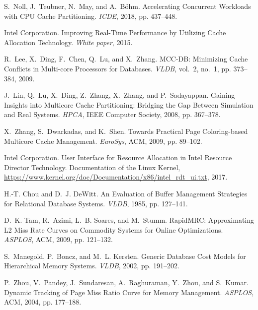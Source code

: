 \documentclass[11pt]{article}
\begin{document}
\begin{thebibliography}{10}
\begin{small}
S.~Noll, J.~Teubner, N.~May, and A.~B\"{o}hm. \newblock Accelerating Concurrent Workloads with CPU Cache Partitioning. \newblock \emph{ICDE}, 2018,
pp. 437--448.

Intel Corporation. \newblock Improving Real-Time Performance by Utilizing Cache Allocation Technology. \newblock \emph{White paper}, 2015.

R.~Lee, X.~Ding, F.~Chen, Q.~Lu, and X.~Zhang. \newblock MCC-DB: Minimizing Cache Conflicts in Multi-core Processors for Databases. \newblock \emph{VLDB},
vol.~2, no.~1, pp. 373--384, 2009.

J.~Lin, Q.~Lu, X.~Ding, Z.~Zhang, X.~Zhang, and P.~Sadayappan. \newblock Gaining Insights into Multicore Cache Partitioning: Bridging the Gap Between Simulation and Real Systems. \newblock \emph{HPCA}, IEEE Computer Society, 2008, pp. 367--378.

X.~Zhang, S.~Dwarkadas, and K.~Shen. \newblock Towards Practical Page Coloring-based Multicore Cache Management. \newblock \emph{EuroSys}, ACM, 2009, pp. 89--102.

Intel Corporation. \newblock User Interface for Resource Allocation in Intel Resource Director Technology. \newblock Documentation of the Linux Kernel, \url{https://www.kernel.org/doc/Documentation/x86/intel_rdt_ui.txt}, 2017.

H.-T. Chou and D.~J. DeWitt. \newblock An Evaluation of Buffer Management Strategies for Relational Database Systems. \newblock \emph{VLDB}, 1985, pp. 127--141.

D.~K. Tam, R.~Azimi, L.~B. Soares, and M.~Stumm. \newblock RapidMRC: Approximating L2 Miss Rate Curves on Commodity Systems for Online Optimizations. \newblock \emph{ASPLOS}, ACM, 2009, pp.
121--132.

S.~Manegold, P.~Boncz, and M.~L. Kersten. \newblock Generic Database Cost Models for Hierarchical Memory Systems. \newblock \emph{VLDB}, 2002, pp. 191--202.

P.~Zhou, V.~Pandey, J.~Sundaresan, A.~Raghuraman, Y.~Zhou, and S.~Kumar. \newblock Dynamic Tracking of Page Miss Ratio Curve for Memory Management. \newblock \emph{ASPLOS}, ACM, 2004, pp.
177--188.


\end{small}
\end{thebibliography}
\end{document}
